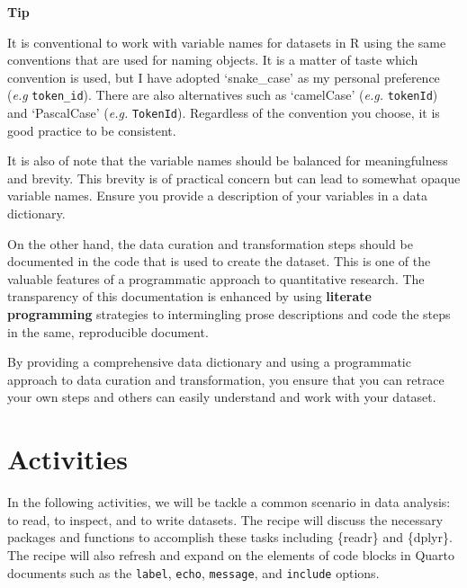 \documentclass[
  letterpaper,
  krantz1]{latex/krantz-mod}
\theoremstyle{definition}
\theoremstyle{definition}
\theoremstyle{remark}
\begin{document}
\begin{tcolorbox}[enhanced jigsaw, leftrule=.75mm, colframe=quarto-callout-color-frame, left=2mm, colback=white, toprule=.15mm, breakable, arc=.35mm, opacityback=0, bottomrule=.15mm, rightrule=.15mm]

\textbf{ Tip}

It is conventional to work with variable names for datasets in R using
the same conventions that are used for naming objects. It is a matter of
taste which convention is used, but I have adopted `snake\_case' as my
personal preference (\emph{e.g} \texttt{token\_id}). There are also
alternatives such as `camelCase' (\emph{e.g.} \texttt{tokenId}) and
`PascalCase' (\emph{e.g.} \texttt{TokenId}). Regardless of the
convention you choose, it is good practice to be consistent.

It is also of note that the variable names should be balanced for
meaningfulness and brevity. This brevity is of practical concern but can
lead to somewhat opaque variable names. Ensure you provide a description
of your variables in a data dictionary.

\end{tcolorbox}

On the other hand, the data curation and transformation steps should be
documented in the code that is used to create the dataset. This is one
of the valuable features of a programmatic approach to quantitative
research. The transparency of this documentation is enhanced by using
\textbf{literate programming} strategies to intermingling prose
descriptions and code the steps in the same, reproducible document.

By providing a comprehensive data dictionary and using a programmatic
approach to data curation and transformation, you ensure that you can
retrace your own steps and others can easily understand and work with
your dataset.

\section*{Activities}\label{activities}


In the following activities, we will be tackle a common scenario in data
analysis: to read, to inspect, and to write datasets. The recipe will
discuss the necessary packages and functions to accomplish these tasks
including \{readr\} and \{dplyr\}. The recipe will also refresh and
expand on the elements of code blocks in Quarto documents such as the
\texttt{label}, \texttt{echo}, \texttt{message}, and \texttt{include}
options.
\end{document}
